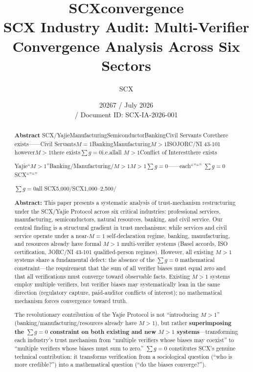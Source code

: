 \documentclass[12pt,a4paper]{article}
\title{
    \textbf{SCXconvergence}
    \\
    \large SCX Industry Audit: Multi-Verifier Convergence Analysis Across Six Sectors
}
\author{SCX}
\date{
    20267 / July 2026
    \\
    \small  / Document ID: SCX-IA-2026-001
}
\theoremstyle{remark}
\newcommand{\sumg}{\sum g}
\newcommand{\sumgeq}{\sum g = 0}
\begin{document}
\maketitle

\begin{abstract}

\noindent
\textbf{Abstract}
SCX/YajieManufacturingSemiconductorBankingCivil Servants
Corethere exists——Civil Servants$M=1$BankingManufacturing$M>1$ISOJORC/NI 43-101
however$M>1$there exists$\sumg=0$i.e.allall
$M>1$Conflict of Interestthere exists

Yajie``$M>1$''Banking/Manufacturing/$M>1$\textbf{$M>1$$\sumgeq$}——each``''``''
$\sumgeq$SCX``''``''

$\sumgeq$all\undeclaredYajie
SCX5,000/SCX1,000--2,500/

\bigskip
\noindent
\textbf{Abstract:}
This paper presents a systematic analysis of trust-mechanism restructuring under the SCX/Yajie Protocol across six critical industries: professional services, manufacturing, semiconductors, natural resources, banking, and civil service.
Our central finding is a structural gradient in trust mechanisms: while services and civil service operate under a near-$M=1$ self-declaration regime, banking, manufacturing, and resources already have formal $M>1$ multi-verifier systems (Basel accords, ISO certification, JORC/NI 43-101 qualified-person regimes).
However, all existing $M>1$ systems share a fundamental defect: the absence of the $\sumgeq$ mathematical constraint—the requirement that the sum of all verifier biases must equal zero and that all verifications must converge toward observable facts.
Existing $M>1$ systems employ multiple verifiers, but verifier biases may systematically lean in the same direction (regulatory capture, paid-auditor conflicts of interest); no mathematical mechanism forces convergence toward truth.

The revolutionary contribution of the Yajie Protocol is not ``introducing $M>1$'' (banking/manufacturing/resources already have $M>1$), but rather \textbf{superimposing the $\sumgeq$ constraint on both existing and new $M>1$ systems}—transforming each industry's trust mechanism from ``multiple verifiers whose biases may coexist'' to ``multiple verifiers whose biases must sum to zero.''
$\sumgeq$ constitutes SCX's genuine technical contribution: it transforms verification from a sociological question (``who is more credible?'') into a mathematical question (``do the biases converge?'').


\end{abstract}
\end{document}
